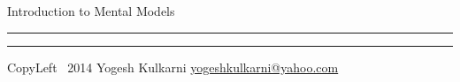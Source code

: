 

\usepackage{beamerarticle} %
\graphicspath{{images/}}



\begin{center}
     \Large{Introduction to Mental Models}  %
\end{center}
\rule{\linewidth}{0.25pt}
\raggedright
\footnotesize
\begin{multicols}{3}


\rule{0.3\linewidth}{0.25pt}

\scriptsize
CopyLeft \textcopyleft\ 2014 Yogesh Kulkarni
\href{http://www.yogeshkulkarni.com}{yogeshkulkarni@yahoo.com}

\end{multicols}

